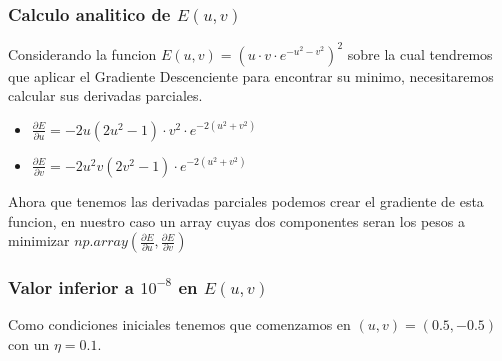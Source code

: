 \subsubsection{Calculo analitico de $E(u,v)$}
Considerando la funcion $E(u,v) =(u\cdot v\cdot e^{-u^2-v^2})^2$ sobre la cual tendremos que aplicar el Gradiente Descenciente para encontrar su minimo, necesitaremos calcular sus derivadas parciales.

\begin{itemize}
  \item $\displaystyle \frac{\partial E}{\partial u} = -2u(2u^2 -1)\cdot v^2 \cdot e^{-2(u^2+v^2)}$
  \item $\displaystyle \frac{\partial E}{\partial v} = -2u^2v (2v^2-1) \cdot e^{-2(u^2+v^2)}$
\end{itemize}

Ahora que tenemos las derivadas parciales podemos crear el gradiente de esta funcion, en nuestro caso un array cuyas dos componentes seran los pesos a minimizar
$np.array(\frac{\partial E}{\partial u}, \frac{\partial E}{\partial v})$
\newpage 
\subsubsection{Valor inferior a $10^{-8}$ en $E(u,v)$}
Como condiciones iniciales tenemos que comenzamos en $(u,v) = (0.5,-0.5)$ con un $\eta = 0.1$.

